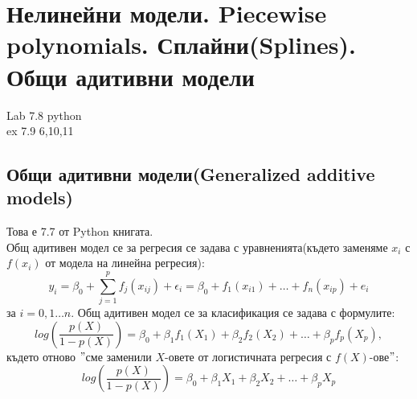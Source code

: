 \section{Нелинейни модели. Piecewise polynomials. Сплайни(Splines). Общи адитивни модели}
Lab 7.8 python \\
ex 7.9 6,10,11 \\
\subsection{Общи адитивни модели(Generalized additive models)}
Това е 7.7 от Python книгата. \\

Общ адитивен модел се за регресия се задава с уравненията(където заменяме $x_i$ с $f(x_i)$ от модела на линейна регресия):
$$y_i = \beta_0 + \sum_{j=1}^p f_j(x_{ij}) + \epsilon_i = \beta_0 + f_1(x_{i1}) + \dots + f_n(x_{ip}) + e_i $$
за $i = 0,1 \dots n$.
Общ адитивен модел се за класификация се задава с формулите:
$$ log(\frac{p(X)}{1-p(X)}) = \beta_0 + \beta_1 f_1(X_1) + \beta_2 f_2(X_2) + \dots + \beta_p f_p(X_p),$$
където отново $"$сме заменили $X$-овете от логистичната регресия с $f(X)$-ове$"$:
$$ log(\frac{p(X)}{1-p(X)}) = \beta_0 + \beta_1 X_1 + \beta_2 X_2 + \dots + \beta_p X_p $$

	
\newpage	